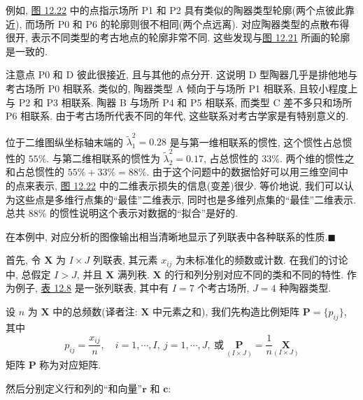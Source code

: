 例如, \hyperref[fig:12.22]{图 12.22} 中的点指示场所 P1 和 P2 具有类似的陶器类型轮廓(两个点彼此靠近), 而场所 P0 和 P6 的轮廓则很不相同(两个点远离). 对应陶器类型的点散布得很开, 表示不同类型的考古地点的轮廓非常不同. 这些发现与\hyperref[fig:12.21]{图 12.21} 所画的轮廓是一致的.

注意点 P0 和 D 彼此很接近, 且与其他的点分开. 这说明 D 型陶器几乎是排他地与考古场所 P0 相联系. 类似的, 陶器类型 A 倾向于与场所 P1 相联系, 且较小程度上与 P2 和 P3 相联系. 陶器 B 与场所 P4 和 P5 相联系, 而类型 C 差不多只和场所 P6 相联系. 由于考古场所代表不同的年代, 这些联系对考古学家是有特别意义的.

位于二维图纵坐标轴末端的 $\tilde{\lambda}_1^2=0.28$ 是与第一维相联系的惯性, 这个惯性占总惯性的 $55\%$. 与第二维相联系的惯性为 $\tilde{\lambda}_2^2=0.17$, 占总惯性的 $33\%$. 两个维的惯性之和占总惯性的 $55\%+33\%=88\%$. 由于这个问题中的数据恰好可以用三维空间中的点来表示, \hyperref[fig:12.22]{图 12.22} 中的二维表示损失的信息(变差)很少. 等价地说, 我们可以认为这些点是多维行点集的“最佳”二维表示, 同时也是多维列点集的“最佳”二维表示. 总共 $88\%$ 的惯性说明这个表示对数据的“拟合”是好的.

在本例中, 对应分析的图像输出相当清晰地显示了列联表中各种联系的性质.\hfill$\blacksquare$


首先, 令 $\mathbf{X}$ 为 $I\times J$ 列联表, 其元素 $x_{ij}$ 为未标准化的频数或计数. 在我们的讨论中, 总假定 $I>J$, 并且 $\mathbf{X}$ 满列秩. $\mathbf{X}$ 的行和列分别对应不同的类和不同的特性. 作为例子, \hyperref[tab:12.8]{表 12.8} 是一张列联表, 其中有 $I=7$ 个考古场所, $J=4$ 种陶器类型.

设 $n$ 为 $\mathbf{X}$ 中的总频数(译者注: $\mathbf{X}$ 中元素之和), 我们先构造比例矩阵 $\mathbf{P}=\{p_{ij}\}$, 其中
\label{eq:12-28}
\begin{equation}
p_{ij}=\frac{x_{ij}}{n},\quad i=1,\cdots,I,\ j=1,\cdots,J,\ \text{或}\
\underset{(I\times J)}{\mathbf{P}}=\frac{1}{n}\underset{(I\times J)}{\mathbf{X}}
\tag{12-28}
\end{equation}
矩阵 $\mathbf{P}$ 称为对应矩阵.

然后分别定义行和列的“和向量”$\mathbf{r}$ 和 $\mathbf{c}$:
